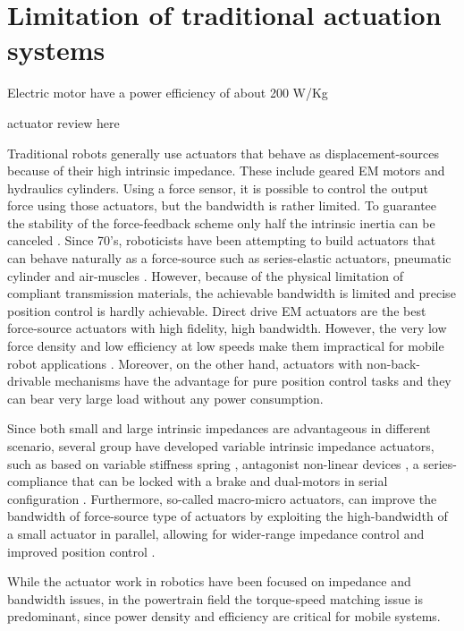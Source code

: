 \section{Limitation of traditional actuation systems}
\label{sec:limitationOfTraditionnalRoboticSystems}

Electric motor have a power efficiency of about 200 W/Kg

actuator review here

Traditional robots generally use actuators that behave as displacement-sources because of their high intrinsic impedance. These include geared EM motors and hydraulics cylinders. Using a force sensor, it is possible to control the output force using those actuators, but the bandwidth is rather limited. To guarantee the stability of the force-feedback scheme only half the intrinsic inertia can be canceled \cite{hogan_impedance_2004}. Since 70's, roboticists have been attempting to build actuators that can behave naturally as a force-source such as series-elastic actuators, pneumatic cylinder and air-muscles \cite{hanafusa_stable_1977}\cite{pratt_series_1995}. However, because of the physical limitation of compliant transmission materials, the achievable bandwidth is limited and precise position control is hardly achievable. Direct drive EM actuators are the best force-source actuators with high fidelity, high bandwidth. However, the very low force density and low efficiency at low speeds make them impractical for mobile robot applications \cite{hollerbach_comparative_1992}. Moreover, on the other hand, actuators with non-back-drivable mechanisms have the advantage for pure position control tasks and they can bear very large load without any power consumption.

Since both small and large intrinsic impedances are advantageous in different scenario, several group have developed variable intrinsic impedance actuators, such as based on variable stiffness spring \cite{tonietti_design_2005}, antagonist non-linear devices \cite{koganezawa_antagonistic_2006}, a series-compliance that can be locked with a brake \cite{leach_linear_2012} and dual-motors in serial configuration \cite{kim_serial-type_2010}. Furthermore, so-called macro-micro actuators, can improve the bandwidth of force-source type of actuators by exploiting the high-bandwidth of a small actuator in parallel, allowing for wider-range impedance control and improved position control \cite{morrell_parallel-coupled_1998}.

While the actuator work in robotics have been focused on impedance and bandwidth issues, in the powertrain field the torque-speed matching issue is predominant, since power density and efficiency are critical for mobile systems.


